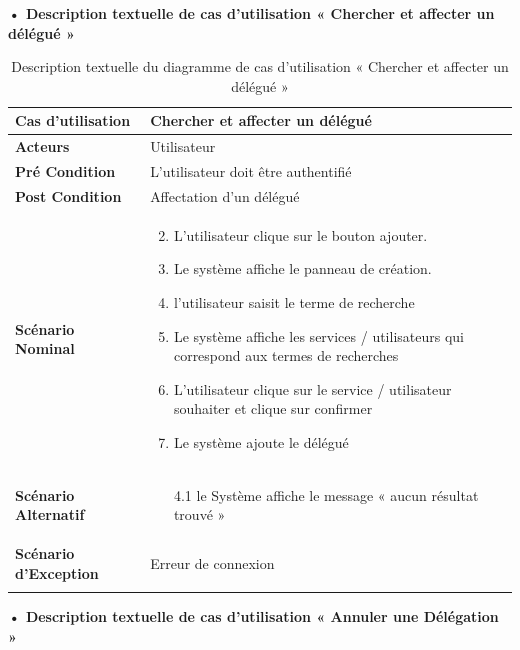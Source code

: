 \textbf{•	Description textuelle de cas d'utilisation « Chercher et affecter un délégué     »}

\begin{longtable}{|p{5cm}|p{10cm}|}
\hline
\textbf{Cas d'utilisation}&Chercher et affecter un délégué      \\
\hline
\textbf{Acteurs}&Utilisateur\\
\hline
\textbf{Pré Condition}&L'utilisateur doit être authentifié\\
\hline
\textbf{Post Condition}&Affectation d'un délégué \\
\hline
\textbf{Scénario Nominal}&
\vspace{-\baselineskip}
\begin{enumerate}
  \setcounter{enumi}{1}
  \item L'utilisateur clique sur le bouton ajouter.
  \item Le système affiche le panneau de création.
  \item l'utilisateur saisit le terme de recherche
  \item Le système affiche les services / utilisateurs qui correspond aux termes de recherches
  \item L'utilisateur clique sur le service / utilisateur souhaiter et clique sur confirmer 
  \item Le système ajoute le délégué 
\end{enumerate}\\
\hline
\textbf{Scénario Alternatif}&
\vspace{-\baselineskip}
\begin{enumerate}
 \item [4.1] le Système affiche le message « aucun résultat trouvé » 
\end{enumerate}\\
\hline
\textbf{Scénario d'Exception}&
Erreur de connexion\\
\hline
\caption{Description textuelle du diagramme de cas d'utilisation « Chercher et affecter un délégué      »}
\label{tab:use_case_search_delegate}
\end{longtable}


\textbf{•	Description textuelle de cas d'utilisation « Annuler une Délégation      »}

